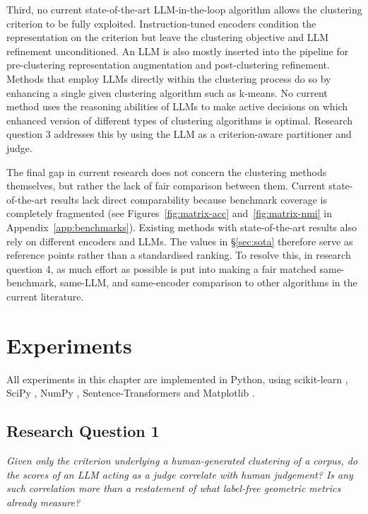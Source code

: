 \documentclass[11pt,a4paper,oneside]{report}
\begin{document}
Third, no current state-of-the-art LLM-in-the-loop algorithm allows the clustering criterion to be fully exploited. Instruction-tuned encoders \citep{su2023instructor} condition the representation on the criterion but leave the clustering objective and LLM refinement unconditioned. An LLM is also mostly inserted into the pipeline for pre-clustering representation augmentation and post-clustering refinement. Methods that employ LLMs directly within the clustering process do so by enhancing a single given clustering algorithm such as k-means. No current method uses the reasoning abilities of LLMs to make active decisions on which enhanced version of different types of clustering algorithms is optimal. Research question 3 addresses this by using the LLM as a criterion-aware partitioner and judge.

The final gap in current research does not concern the clustering methods themselves, but rather the lack of fair comparison between them. Current state-of-the-art results lack direct comparability because benchmark coverage is completely fragmented (see Figures~\ref{fig:matrix-acc} and~\ref{fig:matrix-nmi} in Appendix~\ref{app:benchmarks}). Existing methods with state-of-the-art results also rely on different encoders and LLMs. The values in \S\ref{sec:sota} therefore serve as reference points rather than a standardised ranking. To resolve this, in research question 4, as much effort as possible is put into making a fair matched same-benchmark, same-LLM, and same-encoder comparison to other algorithms in the current literature.

\FloatBarrier
\chapter{Experiments}\label{ch:experiments}

All experiments in this chapter are implemented in Python, using scikit-learn \citep{pedregosa2011sklearn}, SciPy \citep{virtanen2020scipy}, NumPy \citep{harris2020numpy}, Sentence-Transformers \citep{reimers2019sbert} and Matplotlib \citep{hunter2007matplotlib}.

\section{Research Question 1}\label{sec:rq1_exp}

\emph{Given only the criterion underlying a human-generated clustering of a corpus, do the scores of an LLM acting as a judge correlate with human judgement? Is any such correlation more than a restatement of what label-free geometric metrics already measure?}  \\
\end{document}
